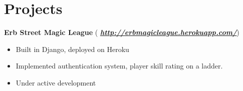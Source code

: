 \documentclass[10pt]{article}
\begin{document}
\section*{\LARGE\sffamily\color{resblue}Projects}
{\bf Erb Street Magic League} ({\it \bf  \color{blue} \href{http://erbmagicleague.herokuapp.com/} {\underline{http://erbmagicleague.herokuapp.com/}}})
\begin{itemize}[label={\color{resblue}\textbullet}]
\setlength\itemsep{0em}
\item Built in Django, deployed on Heroku
\item Implemented authentication system, player skill rating on a ladder.
\item Under active development
\end{itemize}
\end{document}
